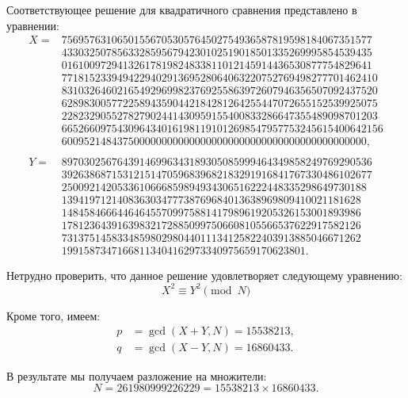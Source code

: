 Соответствующее решение для квадратичного сравнения представлено в уравнении:
\begin{equation}
\begin{aligned}
X = &75695763106501556705305764502754936587819598184067351577 \\
    &43303250785633285956794230102519018501335269995854539435 \\
    &01610097294132617819824833811012145914436530877754829641 \\
    &771815233949422940291369528064063220752769498277701462410 \\
    &831032646021654929699823769255863972607946356507092437520 \\
    &628983005772258943590442184281264255447072655152539925075 \\
    &228232905527827902441430959155400833286647355489098701203 \\
    &6652660975430964340161981191012698547957753245615400642156 \\
    &6009521484375000000000000000000000000000000000000000000, \\ \\
Y = &89703025676439146996343189305085999464349858249769290536 \\
    &39263868715312151470596839682183291916841767330486102677 \\
    &2500921420533610666859894934306516222448335298649730188 \\
    &139419712140836303477738769684013638969809410021181628 \\
    &148458466644646455709975881417989619205326153001893986 \\
    &178123643916398321728850997506608105566537622917582126 \\
    &731375145833485980298044011134125822403913885046671262 \\
    &19915873471668113404162973340975659170623801.
\end{aligned}
\end{equation}

Нетрудно проверить, что данное решение удовлетворяет следующему уравнению:
\begin{equation}
X^2 \equiv Y^2 \pmod{N}
\end{equation}

Кроме того, имеем:
\begin{equation}
\begin{aligned}
p &= \gcd(X + Y, N) = 15538213, \\
q &= \gcd(X - Y, N) = 16860433.
\end{aligned}
\end{equation}

В результате мы получаем разложение на множители:
\begin{equation}
N = 261980999226229 = 15538213 \times 16860433.
\end{equation}

